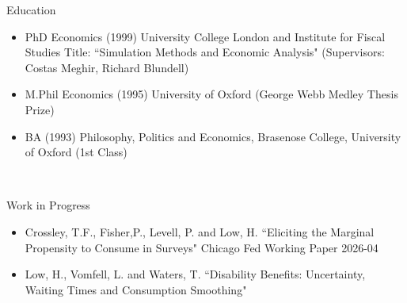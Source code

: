 \documentclass{resume} %
\begin{document}
\begin{rSection}{Education}
\begin{itemize}	
\item PhD Economics (1999) University College London and Institute for Fiscal Studies
Title: ``Simulation Methods and Economic Analysis" (Supervisors: Costas Meghir, Richard Blundell)
\item M.Phil Economics (1995) University of Oxford (George Webb Medley Thesis Prize)
\item BA (1993) Philosophy, Politics and Economics, Brasenose College, University of Oxford (1st Class) 
\end{itemize}
\\

\end{rSection}

\begin{rSection}{Work in Progress}
\begin{itemize} 
\item Crossley, T.F., Fisher,P., Levell, P. and Low, H.  ``Eliciting the Marginal Propensity to Consume in Surveys" Chicago Fed Working Paper 2026-04

\item Low, H., Vomfell, L. and Waters, T. ``Disability Benefits: Uncertainty, Waiting Times and Consumption Smoothing"


\end{itemize}


\end{rSection}
\end{document}
